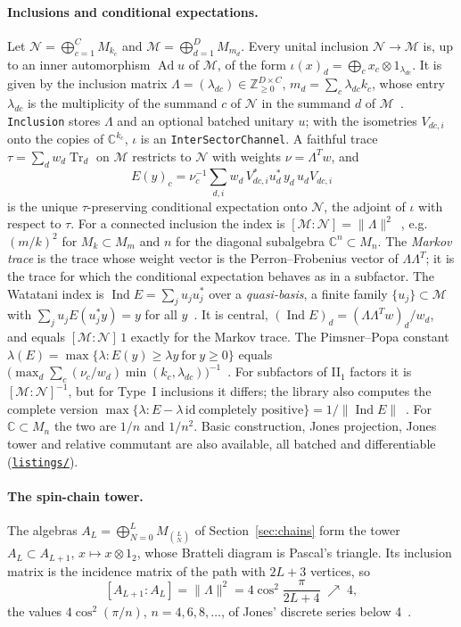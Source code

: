 \documentclass[11pt]{article}
\DeclareMathOperator{\Tr}{Tr}
\newcommand{\C}{\mathbb{C}}
\newcommand{\M}{\mathcal{M}}
\newcommand{\repofile}[1]{\href{https://github.com/andre-a-no/von_neumann_type_i/blob/main/man/article/listings/#1}{\texttt{listings/\allowbreak\detokenize{#1}}}}
\begin{document}
\paragraph{Inclusions and conditional expectations.} Let $\mathcal N=\bigoplus_{c=1}^CM_{k_c}$ and
$\M=\bigoplus_{d=1}^DM_{m_d}$. Every unital inclusion $\mathcal N\to\M$ is, up to an inner automorphism $\operatorname{Ad}u$
of $\M$, of the form $\iota(x)_d=\bigoplus_cx_c\otimes1_{\lambda_{dc}}$. It is given by the inclusion matrix
$\Lambda=(\lambda_{dc})\in\mathbb Z_{\ge0}^{D\times C}$, $m_d=\sum_c\lambda_{dc}k_c$, whose entry $\lambda_{dc}$ is
the multiplicity of the summand $c$ of $\mathcal N$ in the summand $d$ of $\M$~\cite{ghj1989}. \texttt{Inclusion}
stores $\Lambda$ and an optional batched unitary $u$; with the isometries $V_{dc,i}$ onto the copies of $\C^{k_c}$,
$\iota$ is an \texttt{InterSectorChannel}. A faithful trace $\tau=\sum_dw_d\Tr_d$ on $\M$ restricts to $\mathcal N$
with weights $\nu=\Lambda^Tw$, and
\[
  E(y)_c=\nu_c^{-1}\sum_{d,i}w_d\,V_{dc,i}^*u_d^*\,y_d\,u_dV_{dc,i}
\]
is the unique $\tau$-preserving conditional expectation onto $\mathcal N$, the adjoint of $\iota$ with respect to
$\tau$. For a connected inclusion the index is $[\M:\mathcal N]=\|\Lambda\|^2$~\cite{jones1983,ghj1989}, e.g.\
$(m/k)^2$ for $M_k\subset M_m$ and $n$ for the diagonal subalgebra $\C^n\subset M_n$. The \emph{Markov trace} is the
trace whose weight vector is the Perron--Frobenius vector of $\Lambda\Lambda^T$; it is the trace for which the
conditional expectation behaves as in a subfactor. The Watatani index is $\operatorname{Ind}E=\sum_ju_ju_j^*$ over a
\emph{quasi-basis}, a finite family $\{u_j\}\subset\M$ with $\sum_ju_jE(u_j^*y)=y$ for all
$y$~\cite{watatani1990}. It is central, $(\operatorname{Ind}E)_d=(\Lambda\Lambda^Tw)_d/w_d$, and equals $[\M:\mathcal
N]\,1$ exactly for the Markov trace. The Pimsner--Popa constant $\lambda(E)=\max\{\lambda:E(y)\ge\lambda y\ \text{for}\
y\ge0\}$ equals $\bigl(\max_d\sum_c(\nu_c/w_d)\min(k_c,\lambda_{dc})\bigr)^{-1}$~\cite[Theorem~6.1]{pimsner1986}. For
subfactors of II$_1$ factors it is $[\M:\mathcal N]^{-1}$, but for Type~I inclusions it differs; the library also
computes the complete version $\max\{\lambda:E-\lambda\,\mathrm{id}\ \text{completely positive}\}=1/\|\operatorname{Ind}E\|$~\cite{bdh1988,frank1998}.
For $\C\subset M_n$ the two are $1/n$ and $1/n^2$. Basic construction, Jones projection, Jones tower and relative
commutant are also available, all batched and differentiable (\repofile{inclusions.py}).

\paragraph{The spin-chain tower.} The algebras $A_L=\bigoplus_{N=0}^LM_{\binom LN}$ of Section~\ref{sec:chains} form the
tower $A_L\subset A_{L+1}$, $x\mapsto x\otimes1_2$, whose Bratteli diagram is Pascal's triangle. Its inclusion matrix is
the incidence matrix of the path with $2L+3$ vertices, so
\[
  [A_{L+1}:A_L]=\|\Lambda\|^2=4\cos^2\frac{\pi}{2L+4}\;\nearrow\;4 ,
\]
the values $4\cos^2(\pi/n)$, $n=4,6,8,\dots$, of Jones' discrete series below 4~\cite{jones1983}.
\end{document}
